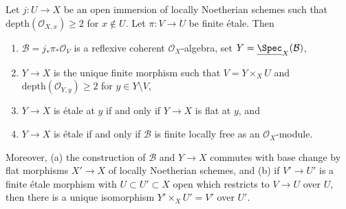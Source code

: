 \begin{lemma}
\label{lemma-extend-S2}
Let $j : U \to X$ be an open immersion of locally Noetherian schemes
such that $\text{depth}(\mathcal{O}_{X, x}) \geq 2$ for $x \not \in U$.
Let $\pi : V \to U$ be finite \'etale. Then
\begin{enumerate}
\item $\mathcal{B} = j_*\pi_*\mathcal{O}_V$ is a reflexive coherent
$\mathcal{O}_X$-algebra, set $Y = \underline{\Spec}_X(\mathcal{B})$,
\item $Y \to X$ is the unique finite morphism such that
$V = Y \times_X U$ and $\text{depth}(\mathcal{O}_{Y, y}) \geq 2$
for $y \in Y \setminus V$,
\item $Y \to X$ is \'etale at $y$ if and only if $Y \to X$ is flat at $y$, and
\item $Y \to X$ is \'etale if and only if $\mathcal{B}$
is finite locally free as an $\mathcal{O}_X$-module.
\end{enumerate}
Moreover, (a) the construction of $\mathcal{B}$ and $Y \to X$ commutes
with base change by flat morphisms $X' \to X$ of locally Noetherian
schemes, and (b) if $V' \to U'$ is a finite \'etale morphism with
$U \subset U' \subset X$ open which restricts to $V \to U$ over $U$,
then there is a unique isomorphism $Y' \times_X U' = V'$ over $U'$.
\end{lemma}

